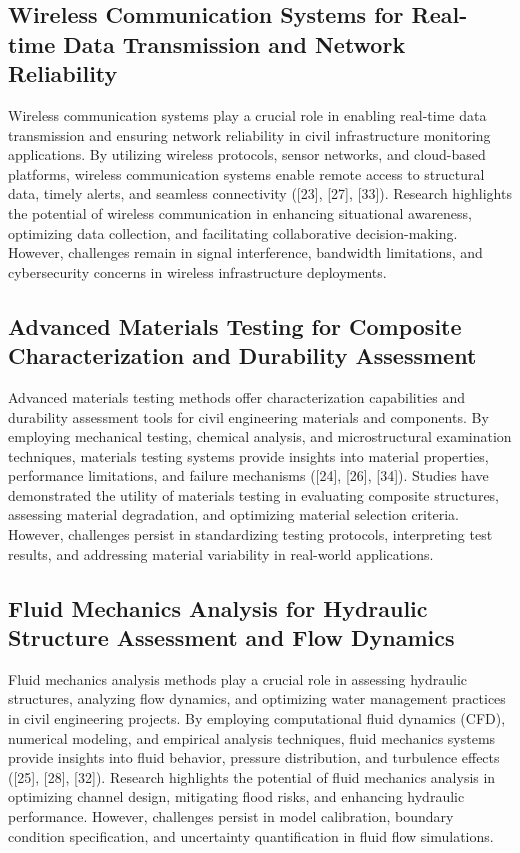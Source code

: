 \documentclass[journal, a4paper]{IEEEtran}
\begin{document}
\subsection{Wireless Communication Systems for Real-time Data Transmission and Network Reliability}

Wireless communication systems play a crucial role in enabling real-time data transmission and ensuring
network reliability in civil infrastructure monitoring applications. By utilizing wireless protocols, sensor
networks, and cloud-based platforms, wireless communication systems enable remote access to structural data,
timely alerts, and seamless connectivity ([23], [27], [33]). Research highlights the potential of wireless
communication in enhancing situational awareness, optimizing data collection, and facilitating collaborative
decision-making. However, challenges remain in signal interference, bandwidth limitations, and cybersecurity
concerns in wireless infrastructure deployments.

\subsection{Advanced Materials Testing for Composite Characterization and Durability Assessment}
Advanced materials testing methods offer characterization capabilities and durability assessment tools for
civil engineering materials and components. By employing mechanical testing, chemical analysis, and microstructural
examination techniques, materials testing systems provide insights into material properties, performance limitations,
and failure mechanisms ([24], [26], [34]). Studies have demonstrated the utility of materials testing in evaluating
composite structures, assessing material degradation, and optimizing material selection criteria.
However, challenges persist in standardizing testing protocols, interpreting test results, and addressing
material variability in real-world applications.

\subsection{Fluid Mechanics Analysis for Hydraulic Structure Assessment and Flow Dynamics}
Fluid mechanics analysis methods play a crucial role in assessing hydraulic structures, analyzing flow dynamics,
and optimizing water management practices in civil engineering projects. By employing computational fluid dynamics (CFD),
numerical modeling, and empirical analysis techniques, fluid mechanics systems provide insights into fluid behavior,
pressure distribution, and turbulence effects ([25], [28], [32]). Research highlights the potential of fluid mechanics
analysis in optimizing channel design, mitigating flood risks, and enhancing hydraulic performance. However, challenges
persist in model calibration, boundary condition specification, and uncertainty quantification in fluid flow simulations.
\end{document}
